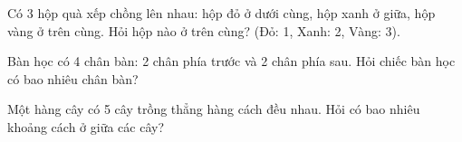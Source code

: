 \begin{ex}
Có 3 hộp quà xếp chồng lên nhau: hộp đỏ ở dưới cùng, hộp xanh ở giữa, hộp vàng ở trên cùng. Hỏi hộp nào ở trên cùng? (Đỏ: 1, Xanh: 2, Vàng: 3).
\end{ex}

\begin{ex}
Bàn học có 4 chân bàn: 2 chân phía trước và 2 chân phía sau. Hỏi chiếc bàn học có bao nhiêu chân bàn?
\end{ex}

\begin{ex}
Một hàng cây có 5 cây trồng thẳng hàng cách đều nhau. Hỏi có bao nhiêu khoảng cách ở giữa các cây?
\end{ex}
